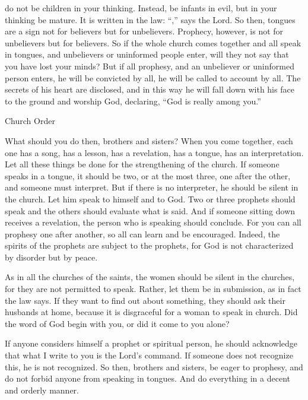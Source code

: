 {do
not
be
children
in your thinking.
Instead,
be infants
in evil,
but
in your thinking
be
mature.
It is written
in
the law: “{},” says
the Lord.
So then,
tongues
are
a sign
not
for believers
but
for unbelievers.
Prophecy,
however,
is not
for unbelievers
but
for believers.
So
if
the whole
church
comes together
and
all
speak
in tongues,
and
unbelievers
or
uninformed
people enter,
will they
not
say
that
you have lost
your minds?
But
if
all
prophesy,
and
an unbeliever
or
uninformed person
enters,
he will be convicted
by
all,
he will be called to account
by
all.
The secrets
of his
heart
are
disclosed,
and
in this way
he will fall down
with
his face
to the ground and worship
God,
declaring,
“God
is
really
among
you.”
\par }{\SH Church Order
\par }{\PP {}What
should you do then,
brothers and sisters? When
you come together,
each one
has
a song,
has
a lesson,
has
a revelation,
has
a tongue,
has
an interpretation.
Let all these things
be done
for
the strengthening of the church.
If
someone
speaks
in
a tongue,
it should be two,
or
at the most
three,
one after the other,
and
someone
must interpret.
But
if
there is
no
interpreter,
he should be silent
in
the church.
Let him speak
to himself
and
to God.
Two
or
three
prophets
should speak
and
the others
should evaluate what is said.
And
if
someone
sitting down
receives a revelation,
the person who is speaking
should conclude.
For
you can
all
prophesy
one after another,
so
all
can learn
and
be encouraged.
Indeed,
the spirits
of the prophets
are subject
to the prophets,
for
God
is
not
characterized by disorder
but
by peace.
\par }{\PP As
in
all
the churches
of the saints,
the women
should be silent
in
the churches,
for
they
are not
permitted
to speak.
Rather,
let them be in submission,
as
in fact the law
says.
If
they want
to find out
about something,
they should ask
their
husbands
at
home,
because
it is
disgraceful
for a woman
to speak
in
church.
Did
the word
of God
begin
with
you,
or
did it come
to
you
alone?
\par }{\PP {}If
anyone
considers
himself a prophet
or
spiritual person,
he should acknowledge
that
what
I write
to you
is
the Lord’s
command.
If
someone
does not recognize
this, he is not recognized.
So then,
brothers and sisters,
be eager
to prophesy,
and
do
not
forbid
anyone from speaking
in tongues.
And
do everything
in a decent
and
orderly manner.

}
